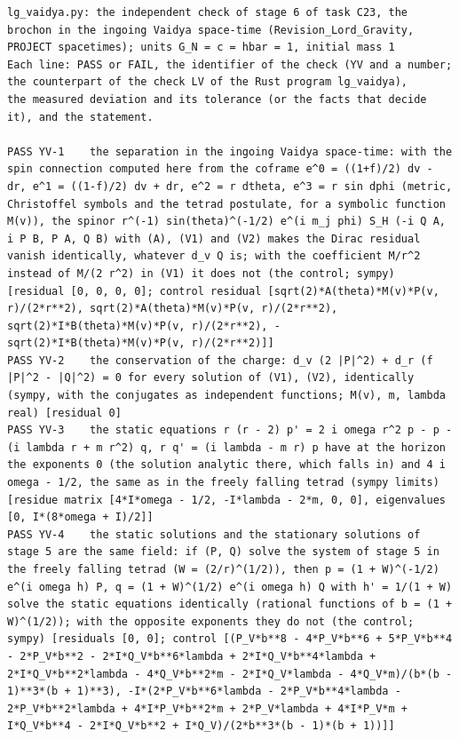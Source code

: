\documentclass[
  10pt,
]{article}
\begin{document}
\begin{verbatim}
lg_vaidya.py: the independent check of stage 6 of task C23, the brochon in the ingoing Vaidya space-time (Revision_Lord_Gravity, PROJECT spacetimes); units G_N = c = hbar = 1, initial mass 1
Each line: PASS or FAIL, the identifier of the check (YV and a number; the counterpart of the check LV of the Rust program lg_vaidya),
the measured deviation and its tolerance (or the facts that decide it), and the statement.

PASS YV-1    the separation in the ingoing Vaidya space-time: with the spin connection computed here from the coframe e^0 = ((1+f)/2) dv - dr, e^1 = ((1-f)/2) dv + dr, e^2 = r dtheta, e^3 = r sin dphi (metric, Christoffel symbols and the tetrad postulate, for a symbolic function M(v)), the spinor r^(-1) sin(theta)^(-1/2) e^(i m_j phi) S_H (-i Q A, i P B, P A, Q B) with (A), (V1) and (V2) makes the Dirac residual vanish identically, whatever d_v Q is; with the coefficient M/r^2 instead of M/(2 r^2) in (V1) it does not (the control; sympy) [residual [0, 0, 0, 0]; control residual [sqrt(2)*A(theta)*M(v)*P(v, r)/(2*r**2), sqrt(2)*A(theta)*M(v)*P(v, r)/(2*r**2), sqrt(2)*I*B(theta)*M(v)*P(v, r)/(2*r**2), -sqrt(2)*I*B(theta)*M(v)*P(v, r)/(2*r**2)]]
PASS YV-2    the conservation of the charge: d_v (2 |P|^2) + d_r (f |P|^2 - |Q|^2) = 0 for every solution of (V1), (V2), identically (sympy, with the conjugates as independent functions; M(v), m, lambda real) [residual 0]
PASS YV-3    the static equations r (r - 2) p' = 2 i omega r^2 p - p - (i lambda r + m r^2) q, r q' = (i lambda - m r) p have at the horizon the exponents 0 (the solution analytic there, which falls in) and 4 i omega - 1/2, the same as in the freely falling tetrad (sympy limits) [residue matrix [4*I*omega - 1/2, -I*lambda - 2*m, 0, 0], eigenvalues [0, I*(8*omega + I)/2]]
PASS YV-4    the static solutions and the stationary solutions of stage 5 are the same field: if (P, Q) solve the system of stage 5 in the freely falling tetrad (W = (2/r)^(1/2)), then p = (1 + W)^(-1/2) e^(i omega h) P, q = (1 + W)^(1/2) e^(i omega h) Q with h' = 1/(1 + W) solve the static equations identically (rational functions of b = (1 + W)^(1/2)); with the opposite exponents they do not (the control; sympy) [residuals [0, 0]; control [(P_V*b**8 - 4*P_V*b**6 + 5*P_V*b**4 - 2*P_V*b**2 - 2*I*Q_V*b**6*lambda + 2*I*Q_V*b**4*lambda + 2*I*Q_V*b**2*lambda - 4*Q_V*b**2*m - 2*I*Q_V*lambda - 4*Q_V*m)/(b*(b - 1)**3*(b + 1)**3), -I*(2*P_V*b**6*lambda - 2*P_V*b**4*lambda - 2*P_V*b**2*lambda + 4*I*P_V*b**2*m + 2*P_V*lambda + 4*I*P_V*m + I*Q_V*b**4 - 2*I*Q_V*b**2 + I*Q_V)/(2*b**3*(b - 1)*(b + 1))]]

\end{verbatim}
\end{document}
